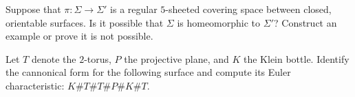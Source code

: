 \begin{alist}
\item Suppose that $\pi:\Sigma\rightarrow \Sigma'$ is a regular
$5$-sheeted covering space between closed, orientable surfaces. Is it
possible that $\Sigma$ is homeomorphic to $\Sigma'$? Construct an
example or prove it is not possible.
\item Let $T$ denote the $2$-torus, $P$ the projective plane, and $K$
the Klein bottle. Identify the cannonical form for the following
surface and compute its Euler characteristic: $K\# T\# T\# P\# K\# T$.
\end{alist}
